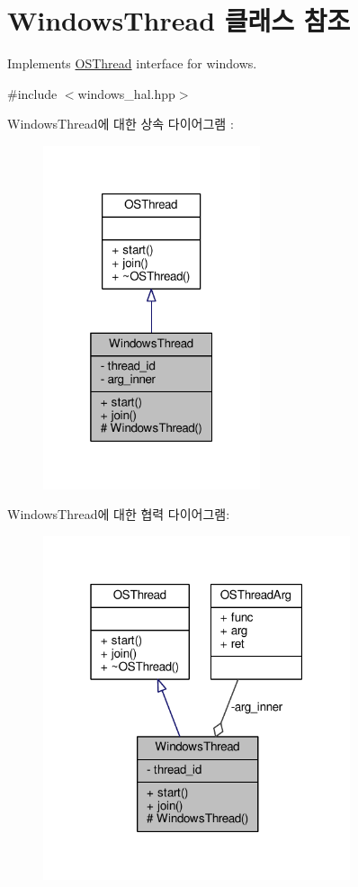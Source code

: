 \hypertarget{class_windows_thread}{}\section{Windows\+Thread 클래스 참조}
\label{class_windows_thread}


Implements \hyperlink{class_o_s_thread}{O\+S\+Thread} interface for windows.  




{\ttfamily \#include $<$windows\+\_\+hal.\+hpp$>$}



Windows\+Thread에 대한 상속 다이어그램 \+: 
\nopagebreak
\begin{figure}[H]
\begin{center}
\leavevmode
\includegraphics[width=181pt]{class_windows_thread__inherit__graph}
\end{center}
\end{figure}


Windows\+Thread에 대한 협력 다이어그램\+:
\nopagebreak
\begin{figure}[H]
\begin{center}
\leavevmode
\includegraphics[width=256pt]{class_windows_thread__coll__graph}
\end{center}
\end{figure}
